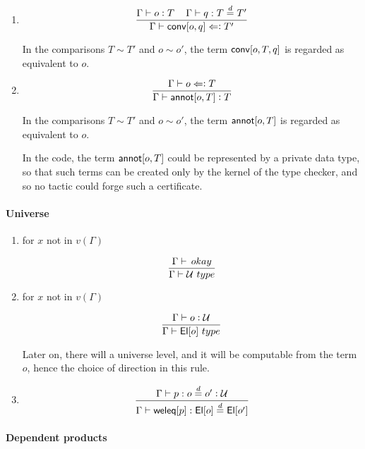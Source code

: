 \documentclass[11pt]{article}
\newcommand{\eqd}{\stackrel{d}{=}}
\newcommand{\Eu}{{\cal U}}
\newcommand{\spc}{{\,\,\,\,\,\,\,}}
\newcommand{\synth}{\vcentcolon} %
\newcommand{\ccheck}{\Leftarrow\vcentcolon}
\newcommand{\Type}{\mathop{{\, \sc type}}}
\newcommand{\Okay}{\mathop{{\, \sc okay}}}
\newcommand{\ha}[2]{#1[#2]}
\newcommand{\El}{{\sf El}}
\newcommand{\annot}{{\sf annot}}
\newcommand{\conv}{{\sf conv}}
\newcommand{\weleq}{{\sf weleq}}
\begin{document}
\begin{enumerate}
\item 
$$\frac{\Gamma\vdash o \synth T\spc \Gamma\vdash q : T \eqd T'}{\Gamma\vdash \ha\conv{o,q} \ccheck T'}$$

In the comparisons $T\sim T'$ and $o\sim o'$, the term $\ha\conv{o,T,q}$ is regarded as equivalent to $o$.

\item 
$$\frac{\Gamma\vdash o \ccheck T}{\Gamma\vdash \ha\annot{o,T} \synth T}$$

In the comparisons $T\sim T'$ and $o\sim o'$, the term $\ha\annot{o,T}$ is regarded as equivalent to $o$.

In the code, the term $\ha\annot{o,T}$ could be represented by a private data
type, so that such terms can be created only by the kernel of the type checker,
and so no tactic could forge such a certificate.

\end{enumerate}

\paragraph{Universe}

\begin{enumerate}

\item for $x$ not in $v(\Gamma)$

$$\frac{\Gamma\vdash\Okay}{\Gamma \vdash \Eu\Type}$$

\item for $x$ not in $v(\Gamma)$

$$\frac{\Gamma\vdash o \synth \Eu}{\Gamma \vdash \ha\El{o}\Type}$$

Later on, there will a universe level, and it will be computable from the
term $o$, hence the choice of direction in this rule.

\item 

$$\frac{\Gamma\vdash p : o \eqd o' \synth \Eu}{\Gamma\vdash \ha\weleq{p} : \ha\El{o} \eqd \ha\El{o'}}$$

\end{enumerate}

\paragraph{Dependent products}
\end{document}
